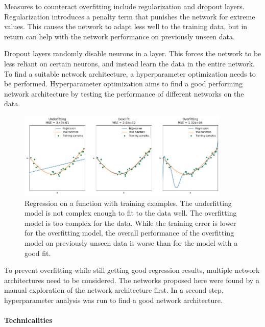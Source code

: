 Measures to counteract overfitting include regularization and dropout layers.
Regularization introduces a penalty term that punishes the network for extreme values.
This causes the network to adapt less well to the training data, but in return can help with the network
performance on previously unseen data.

Dropout layers randomly disable neurons in a layer.
This forces the network to be less reliant on certain neurons, and instead learn the data in the entire network.
\\

To find a suitable network architecture, a hyperparameter optimization needs to be performed.
Hyperparameter optimization aims to find a good performing network architecture by testing the performance
of different networks on the data.

\begin{figure} [h]
    \centering
    \includegraphics[width=0.9\textwidth]{figures/regression/overfitting.png} 
    \caption[Overfitting]{Regression on a function with training examples. 
            The underfitting model is not complex enough to fit to the data well. 
            The overfitting model is too complex for the data.
            While the training error is lower for the overfitting model, 
            the overall performance of the overfitting model on previously unseen data 
            is worse than for the model with a good fit.
        }
    \label{fig:overfitting}
\end{figure}
  
To prevent overfitting while still getting good regression results, multiple network architectures need to be considered.
The networks proposed here were found by a manual exploration of the network architecture first.
In a second step, hyperparameter analysis was run to find a good network architecture.

\paragraph{Technicalities}

